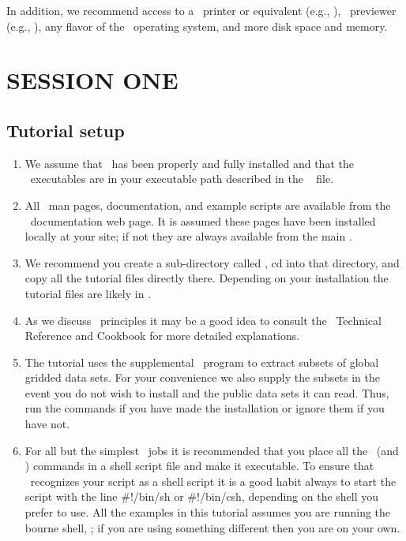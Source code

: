 \documentclass{report}
\begin{document}
In addition, we recommend access to a \PS\ printer or equivalent
(e.g., ), \PS\ previewer (e.g., ),
any flavor of the \UNIX\ operating system, and more disk space and memory.

\chapter{SESSION ONE} 
\thispagestyle{headings}

\section{Tutorial setup}
\begin{enumerate}

\item We assume that \GMT\ has been properly and fully
installed and that the \GMT\ executables are in your executable path
described in the \GMT\  file.

\item All \GMT\ man pages, documentation, and example scripts
are available from the \GMT\ documentation web page.  It is
assumed these pages have been installed locally at your site;
if not they are always available from the main
.

\item We recommend you create a sub-directory called ,
cd into that directory, and copy all the tutorial files directly
there. Depending on your installation the tutorial files are likely in .

\item As we discuss \GMT\ principles it may be a good idea to
consult the \GMT\ Technical Reference and Cookbook for more
detailed explanations.

\item The tutorial uses the supplemental \GMT\ program
 to extract subsets of global gridded data
sets.  For your convenience we also supply the subsets in the
event you do not wish to install  and the
public data sets it can read.  Thus, run the 
commands if you have made the installation or ignore them if
you have not.

\item For all but the simplest \GMT\ jobs it is recommended that
you place all the \GMT\ (and \UNIX) commands in a shell script
file and make it executable.  To ensure that \UNIX\ recognizes
your script as a shell script it is a good habit always to start
the script with the line \#!/bin/sh or \#!/bin/csh, depending on the shell you prefer to use.
All the examples in this tutorial assumes you are running the bourne shell, ; if you are using
something different then you are on your own.


\end{enumerate}
\end{document}

